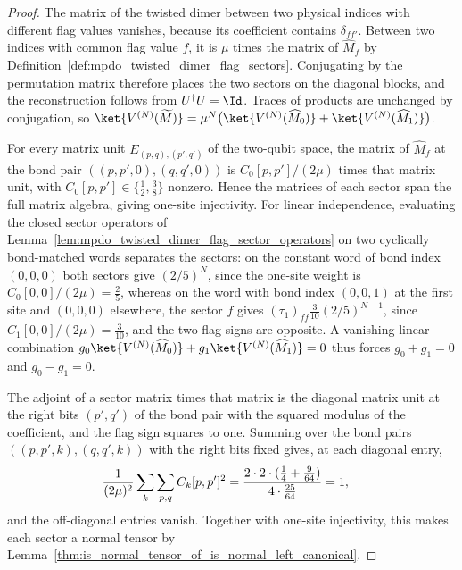 \begin{proof}\leanok
    The matrix of the twisted dimer between two physical indices with
    different flag values vanishes, because its coefficient contains
    $\delta_{ff'}$. Between two indices with common flag value $f$, it is
    $\mu$ times the matrix of $\widehat M_f$ by
    Definition~\ref{def:mpdo_twisted_dimer_flag_sectors}. Conjugating by the
    permutation matrix therefore places the two sectors on the diagonal
    blocks, and the reconstruction follows from $U^\dagger U=\Id$.
    Traces of products are unchanged by conjugation, so
    $\ket{V^{(N)}(\widetilde M)}
        =\mu^N\bigl(\ket{V^{(N)}(\widehat M_0)}
        +\ket{V^{(N)}(\widehat M_1)}\bigr)$.

    For every matrix unit $E_{(p,q),(p',q')}$ of the two-qubit space, the
    matrix of $\widehat M_f$ at the bond pair $((p,p',0),(q,q',0))$ is
    $C_0[p,p']/(2\mu)$ times that matrix unit, with
    $C_0[p,p']\in\{\frac12,\frac38\}$ nonzero. Hence the matrices of each
    sector span the full matrix algebra, giving one-site injectivity.
    For linear independence, evaluating the closed
    sector operators of Lemma~\ref{lem:mpdo_twisted_dimer_flag_sector_operators}
    on two cyclically bond-matched words separates the sectors: on the
    constant word of bond index $(0,0,0)$ both sectors give $(2/5)^N$, since
    the one-site weight is $C_0[0,0]/(2\mu)=\frac25$, whereas on the word
    with bond index $(0,0,1)$ at the first site and $(0,0,0)$ elsewhere, the
    sector $f$ gives $(\tau_1)_{ff}\frac{3}{10}(2/5)^{N-1}$, since
    $C_1[0,0]/(2\mu)=\frac3{10}$, and the two flag signs are opposite.
    A vanishing linear combination
    $g_0\ket{V^{(N)}(\widehat M_0)}
        +g_1\ket{V^{(N)}(\widehat M_1)}=0$
    thus forces $g_0+g_1=0$ and $g_0-g_1=0$.

    The adjoint of a sector matrix times that matrix is the diagonal matrix
    unit at the right bits $(p',q')$ of the bond pair with the squared modulus
    of the coefficient, and the flag sign squares to one. Summing over the
    bond pairs $((p,p',k),(q,q',k))$ with the right bits fixed gives, at each
    diagonal entry,
    \begin{align}
        \frac{1}{(2\mu)^2}\sum_{k}\sum_{p,q}C_k[p,p']^2
         & =\frac{2\cdot2\cdot(\tfrac14+\tfrac9{64})}{4\cdot\tfrac{25}{64}}
        =1,
        \notag
    \end{align}
    and the off-diagonal entries vanish. Together with one-site injectivity,
    this makes each sector a normal tensor by
    Lemma~\ref{thm:is_normal_tensor_of_is_normal_left_canonical}.
\end{proof}

